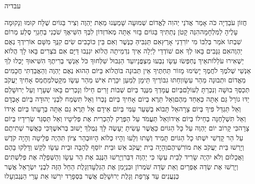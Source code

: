 \documentclass[../main/main.tex]{subfiles}
\begin{document}
\Incipit{}עבדיה\par
\vspace{\afterchapskip}
\RTLmulticolcolumns
\begin{multicols}{\ncols}
חֲזוֹן עֹבַדְיָה כֹּה אָמַר אֲדֹנַי יְהוִה לֶאֱדוֹם שְׁמוּעָה שָׁמַעְנוּ מֵאֵת יַהְוֶה וְצִיר בַּגּוֹיִם שֻׁלָּח קוּמוּ וְנָקוּמָה עָלֶיהָ לַמִּלְחָמָה\PreVerseSpace{}הִנֵּה קָטֹן נְתַתִּיךָ בַּגּוֹיִם בָּזוּי אַתָּה מְאֹד\PreVerseSpace{}זְדוֹן לִבְּךָ הִשִּׁיאֶךָ שֹׁכְנִי בְחַגְוֵי סֶלַע מְרוֹם שִׁבְתּוֹ אֹמֵר בְּלִבּוֹ מִי יוֹרִדֵנִי אָרֶץ\PreVerseSpace{}אִם תַּגְבִּיהַּ כַּנֶּשֶׁר וְאִם בֵּין כּוֹכָבִים שִׂים קִנֶּךָ מִשָּׁם אוֹרִידְךָ נְאֻם יַהְוֶה\PreVerseSpace{}אִם גַּנָּבִים בָּאוּ לְךָ אִם שׁוֹדְדֵי לַיְלָה אֵיךְ נִדְמֵיתָה הֲלוֹא יִגְנְבוּ דַּיָּם אִם בֹּצְרִים בָּאוּ לָךְ הֲלוֹא יַשְׁאִירוּ עֹלֵלוֹת\PreVerseSpace{}אֵיךְ נֶחְפְּשׂוּ עֵשָׂו נִבְעוּ מַצְפֻּנָיו\PreVerseSpace{}עַד הַגְּבוּל שִׁלְּחוּךָ כֹּל אַנְשֵׁי בְרִיתֶךָ הִשִּׁיאוּךָ יָכְלוּ לְךָ אַנְשֵׁי שְׁלֹמֶךָ לֹחֲמֶךָ\SubEnd{} יָשִׂימוּ מָזוֹר תַּחְתֶּיךָ אֵין תְּבוּנָה בּוֹ\PreVerseSpace{}הֲלוֹא בַּיּוֹם הַהוּא נְאֻם יַהְוֶה וְהַאֲבַדְתִּי חֲכָמִים מֵאֱדוֹם וּתְבוּנָה מֵהַר עֵשָׂו\PreVerseSpace{}וְחַתּוּ גִבּוֹרֶיךָ תֵּימָן לְמַעַן יִכָּרֶת אִישׁ מֵהַר עֵשָׂו מִקָּטֶל\PreVerseSpace{}מֵחֲמַס אָחִיךָ יַעֲקֹב תְּכַסְּךָ בוּשָׁה וְנִכְרַתָּ לְעוֹלָם\PreVerseSpace{}בְּיוֹם עֲמָדְךָ מִנֶּגֶד בְּיוֹם שְׁבוֹת זָרִים חֵילוֹ וְנָכְרִים בָּאוּ שְׁעָרָו וְעַל יְרוּשָׁלֵם יַדּוּ גוֹרָל גַּם אַתָּה כְּאַחַד מֵהֶם\PreVerseSpace{}וְאַל תֵּרֶא בְיוֹם אָחִיךָ בְּיוֹם נָכְרוֹ וְאַל תִּשְׂמַח לִבְנֵי יְהוּדָה בְּיוֹם אָבְדָם וְאַל תַּגְדֵּל פִּיךָ בְּיוֹם צָרָה\PreVerseSpace{}אַל תָּבוֹא בְשַׁעַר עַמִּי בְּיוֹם אֵידָם אַל תֵּרֶא גַם אַתָּה בְּרָעָתוֹ בְּיוֹם אֵידוֹ וְאַל תִּשְׁלָחֶנָּה\SubEnd{} בְחֵילוֹ בְּיוֹם אֵידוֹ\PreVerseSpace{}וְאַל תַּעֲמֹד עַל הַפֶּרֶק לְהַכְרִית אֶת פְּלִיטָיו וְאַל תַּסְגֵּר שְׂרִידָיו בְּיוֹם צָרָה\PreVerseSpace{}כִּי קָרוֹב יוֹם יַהְוֶה עַל כָּל הַגּוֹיִם כַּאֲשֶׁר עָשִׂיתָ יֵעָשֶׂה לָּךְ גְּמֻלְךָ יָשׁוּב בְּרֹאשֶׁךָ\PreVerseSpace{}כִּי כַּאֲשֶׁר שְׁתִיתֶם עַל הַר קָדְשִׁי יִשְׁתּוּ כָל הַגּוֹיִם תָּמִיד וְשָׁתוּ וְלָעוּ וְהָיוּ כְּלוֹא הָיוּ\PreVerseSpace{}וּבְהַר צִיּוֹן תִּהְיֶה פְלֵיטָה וְהָיָה קֹדֶשׁ וְיָרְשׁוּ בֵּית יַעֲקֹב אֵת מוֹרִשֵׁיהֶם\SubEnd{}\PreVerseSpace{}וְהָיָה בֵית יַעֲקֹב אֵשׁ וּבֵית יוֹסֵף לֶהָבָה וּבֵית עֵשָׂו לְקַשׁ וְדָלְקוּ בָהֶם וַאֲכָלוּם וְלֹא יִהְיֶה שָׂרִיד לְבֵית עֵשָׂו כִּי יַהְוֶה דִּבֵּר\PreVerseSpace{}וְיָרְשׁוּ הַנֶּגֶב אֶת הַר עֵשָׂו וְהַשְּׁפֵלָה אֶת פְּלִשְׁתִּים וְיָרְשׁוּ אֶת שְׂדֵה אֶפְרַיִם וְאֵת שְׂדֵה שֹׁמְרוֹן וּבִנְיָמִן אֶת הַגִּלְעָד\PreVerseSpace{}וְגָלֻת הַחֵל הַזֶּה לִבְנֵי יִשְׂרָאֵל אֲשֶׁר כְּנַעֲנִים עַד צָרְפַת וְגָלֻת יְרוּשָׁלֵם אֲשֶׁר בִּסְפָרַד יִרְשׁוּ אֵת עָרֵי הַנֶּגֶב\PreVerseSpace{}וְעָלוּ 
\end{multicols}
\end{document}

